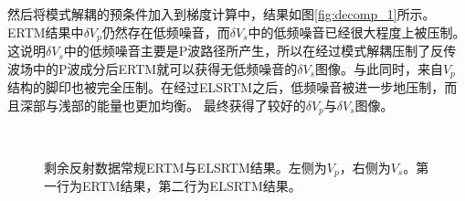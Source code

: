 然后将模式解耦的预条件加入到梯度计算中，结果如图\ref{fig:decomp_1}所示。ERTM结果中$\delta
V_p$仍然存在低频噪音，而$\delta
V_s$中的低频噪音已经很大程度上被压制。这说明$\delta
V_s$中的低频噪音主要是P波路径所产生，所以在经过模式解耦压制了反传波场中的P波成分后ERTM就可以获得无低频噪音的$\delta
V_s$图像。与此同时，来自$V_p$结构的脚印也被完全压制。在经过ELSRTM之后，低频噪音被进一步地压制，而且深部与浅部的能量也更加均衡。
最终获得了较好的$\delta V_p$与$\delta V_s$图像。
\begin{figure}[!htb]
   \centering
   \\
   \caption{剩余反射数据常规ERTM与ELSRTM结果。左侧为$V_p$，右侧为$V_s$。第一行为ERTM结果，第二行为ELSRTM结果。}
   \label{fig:node_1_refl}
\end{figure}

